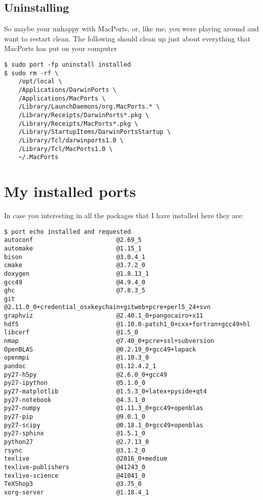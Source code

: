 \documentclass[11pt]{article}
\begin{document}
\subsection{Uninstalling}
So maybe your unhappy with MacPorts, or, like me, you were playing around and want to restart clean. The following should clean up just about everything that MacPorts has put on your computer
\begin{lstlisting}[style=Bash]
$ sudo port -fp uninstall installed
$ sudo rm -rf \
    /opt/local \
    /Applications/DarwinPorts \
    /Applications/MacPorts \
    /Library/LaunchDaemons/org.MacPorts.* \
    /Library/Receipts/DarwinPorts*.pkg \
    /Library/Receipts/MacPorts*.pkg \
    /Library/StartupItems/DarwinPortsStartup \
    /Library/Tcl/darwinports1.0 \
    /Library/Tcl/MacPorts1.0 \
    ~/.MacPorts
\end{lstlisting}



%
%
\appendix

\section{My installed ports}

In case you interesting in all the packages that I have installed here they are:
\begin{lstlisting}[style=Bash]
$ port echo installed and requested
autoconf                       @2.69_5 
automake                       @1.15_1 
bison                          @3.0.4_1 
cmake                          @3.7.2_0 
doxygen                        @1.8.13_1 
gcc49                          @4.9.4_0 
ghc                            @7.8.3_5 
git                            @2.11.0_0+credential_osxkeychain+gitweb+pcre+perl5_24+svn 
graphviz                       @2.40.1_0+pangocairo+x11 
hdf5                           @1.10.0-patch1_0+cxx+fortran+gcc49+hl 
libcerf                        @1.5_0 
nmap                           @7.40_0+pcre+ssl+subversion 
OpenBLAS                       @0.2.19_0+gcc49+lapack 
openmpi                        @1.10.3_0 
pandoc                         @1.12.4.2_1 
py27-h5py                      @2.6.0_0+gcc49 
py27-ipython                   @5.1.0_0 
py27-matplotlib                @1.5.3_0+latex+pyside+qt4 
py27-notebook                  @4.3.1_0 
py27-numpy                     @1.11.3_0+gcc49+openblas 
py27-pip                       @9.0.1_0 
py27-scipy                     @0.18.1_0+gcc49+openblas 
py27-sphinx                    @1.5.1_0 
python27                       @2.7.13_0 
rsync                          @3.1.2_0 
texlive                        @2016_0+medium 
texlive-publishers             @41243_0 
texlive-science                @41041_0 
TeXShop3                       @3.75_0 
xorg-server                    @1.18.4_1 
\end{lstlisting}
\end{document}
